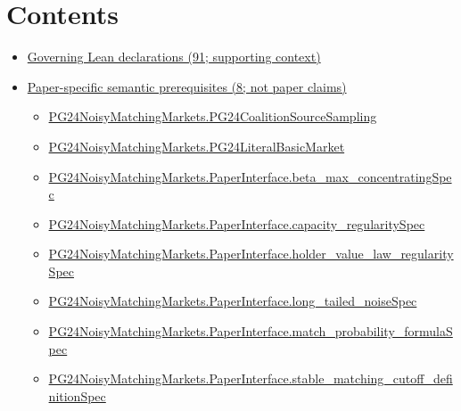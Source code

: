 \documentclass[10pt]{article}
\begin{document}
\section*{Contents}
\begin{itemize}[leftmargin=1.2em]
\item \hyperlink{governing-declaration-section-5ef5ef0364b6939c}{Governing Lean declarations (91; supporting context)}
\item \hyperlink{paper-prerequisite-section-5ef5ef0364b6939c}{Paper-specific semantic prerequisites (8; not paper claims)}
\begin{itemize}[leftmargin=1.2em]
\item \hyperlink{paper-prerequisite-ff3f13051cdbc914}{PG24\allowbreak{}Noisy\allowbreak{}Matching\allowbreak{}Markets.\allowbreak{}PG24\allowbreak{}Coalition\allowbreak{}Source\allowbreak{}Sampling}
\item \hyperlink{paper-prerequisite-c7f1778ccec10a69}{PG24\allowbreak{}Noisy\allowbreak{}Matching\allowbreak{}Markets.\allowbreak{}PG24\allowbreak{}Literal\allowbreak{}Basic\allowbreak{}Market}
\item \hyperlink{paper-prerequisite-e7d4a295961f7481}{PG24\allowbreak{}Noisy\allowbreak{}Matching\allowbreak{}Markets.\allowbreak{}Paper\allowbreak{}Interface.\allowbreak{}beta\_\allowbreak{}max\_\allowbreak{}concentrating\allowbreak{}Spec}
\item \hyperlink{paper-prerequisite-43c0061a94bae683}{PG24\allowbreak{}Noisy\allowbreak{}Matching\allowbreak{}Markets.\allowbreak{}Paper\allowbreak{}Interface.\allowbreak{}capacity\_\allowbreak{}regularity\allowbreak{}Spec}
\item \hyperlink{paper-prerequisite-303fbbfacf485b9e}{PG24\allowbreak{}Noisy\allowbreak{}Matching\allowbreak{}Markets.\allowbreak{}Paper\allowbreak{}Interface.\allowbreak{}holder\_\allowbreak{}value\_\allowbreak{}law\_\allowbreak{}regularity\allowbreak{}Spec}
\item \hyperlink{paper-prerequisite-7d3f65be7a4787b0}{PG24\allowbreak{}Noisy\allowbreak{}Matching\allowbreak{}Markets.\allowbreak{}Paper\allowbreak{}Interface.\allowbreak{}long\_\allowbreak{}tailed\_\allowbreak{}noise\allowbreak{}Spec}
\item \hyperlink{paper-prerequisite-a3b59b88e9ed2ee1}{PG24\allowbreak{}Noisy\allowbreak{}Matching\allowbreak{}Markets.\allowbreak{}Paper\allowbreak{}Interface.\allowbreak{}match\_\allowbreak{}probability\_\allowbreak{}formula\allowbreak{}Spec}
\item \hyperlink{paper-prerequisite-083c0bfe40f05233}{PG24\allowbreak{}Noisy\allowbreak{}Matching\allowbreak{}Markets.\allowbreak{}Paper\allowbreak{}Interface.\allowbreak{}stable\_\allowbreak{}matching\_\allowbreak{}cutoff\_\allowbreak{}definition\allowbreak{}Spec}

\end{itemize}
\end{itemize}
\end{document}
